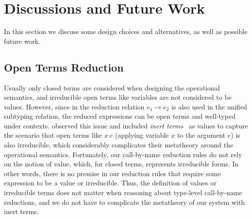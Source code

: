\section{Discussions and Future Work}

In this section we discuss some design choices and alternatives, as well
as possible future work.

\subsection{Open Terms Reduction}
\label{sec:open-term-reduction}

Usually only closed terms are considered when designing the operational semantics,
and irreducible open terms like variables are not considered to be values.
However, since in \name the reduction relation $e_1 \longrightarrow e_2$ is also
used in the unified subtyping relation, the reduced expressions can be open terms and well-typed under contexts.
\citet{full} observed this issue and included \emph{inert terms}~\citep{opencbv} as values
to capture the scenario that open terms like $x~e$
(applying variable $x$ to the argument $e$) is also irreducible, which considerably
complicates their metatheory around the operational semantics.
Fortunately, our call-by-name reduction rules do not rely on the notion of value,
which, for closed terms, represents irreducible forms.
In other words, there is no premise in our reduction rules that require
some expression to be a value or irreducible.
Thus, the definition of values or irreducible terms does not matter when reasoning about
type-level call-by-name reductions, and we do not have to complicate the metatheory of our system
with inert terms.


